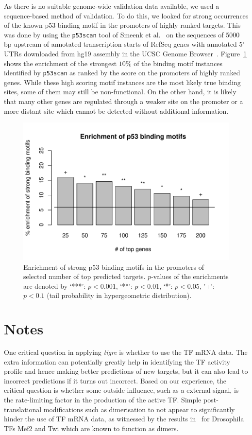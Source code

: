\documentclass[11pt]{article}
\newcommand{\Rpackage}[1]{\emph{#1}}
\newcommand{\tigre}[0]{\Rpackage{tigre}}
\begin{document}
As there is no suitable genome-wide validation data available, we used
a sequence-based method of validation.  To do this, we looked for
strong occurrences of the known p53 binding motif in the promoters of
highly ranked targets.  This was done by using the \texttt{p53scan}
tool of Smeenk et al.~\cite{Smeenk2008} on the sequences of 5000 bp
upstream of annotated transcription starts of RefSeq genes with
annotated 5' UTRs downloaded from hg19 assembly in the UCSC Genome
Browser~\cite{Fujita2011}.  Figure~\ref{fig:p53_validation} shows the
enrichment of the strongest $10 \%$ of the binding motif instances
identified by \texttt{p53scan} as ranked by the score on the promoters
of highly ranked genes.  While these high scoring motif instances are
the most likely true binding sites, some of them may still be
non-functional.  On the other hand, it is likely that many other genes
are regulated through a weaker site on the promoter or a more distant
site which cannot be detected without additional information.

\begin{figure}[htb]
  \centering
  \includegraphics[width=.7\textwidth]{p53_validation}
  \caption{Enrichment of strong p53 binding motifs in the promoters of
    selected number of top predicted targets.  $p$-values of the
    enrichments are denoted by `***': $p < 0.001$, `**': $p < 0.01$,
    `*': $p < 0.05$, '+': $p < 0.1$ (tail probability in
    hypergeometric distribution).}
  \label{fig:p53_validation}
\end{figure}

\section{Notes}

One critical question in applying \tigre{} is whether to use the TF
mRNA data.  The extra information can potentially greatly help in
identifying the TF activity profile and hence making better
predictions of new targets, but it can also lead to incorrect
predictions if it turns out incorrect.  Based on our experience, the
critical question is whether some outside influence, such as a
external signal, is the rate-limiting factor in the production of the
active TF.  Simple post-translational modifications such as
dimerisation to not appear to significantly hinder the use of TF mRNA
data, as witnessed by the results in~\cite{Honkela2010PNAS} for
Drosophila TFs Mef2 and Twi which are known to function as dimers.



\end{document}
